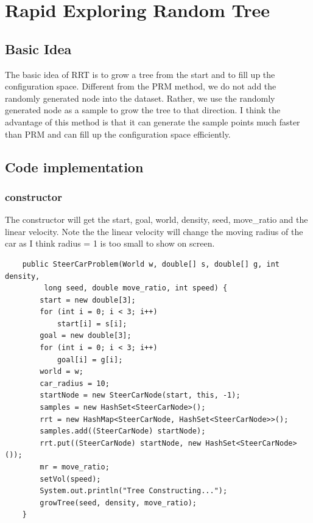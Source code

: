 \documentclass{article}
\begin{document}
\section{Rapid Exploring Random Tree}
\subsection{Basic Idea}
The basic idea of RRT is to grow a tree from the start and to fill up the configuration space. Different from the PRM method, we do not add the randomly generated node into the dataset. Rather, we use the randomly generated node as a sample to grow the tree to that direction. I think the advantage of this method is that it can generate the sample points much faster than PRM and can fill up the configuration space efficiently.

\clearpage
\subsection{Code implementation}
\subsubsection{constructor}
The constructor will get the start, goal, world, density, seed, move\_ratio and the linear velocity. Note the the linear velocity will change the moving radius of the car as I think radius = 1 is too small to show on screen.
\begin{lstlisting}
	public SteerCarProblem(World w, double[] s, double[] g, int density,
		 long seed, double move_ratio, int speed) {
		start = new double[3];
		for (int i = 0; i < 3; i++)
			start[i] = s[i];
		goal = new double[3];
		for (int i = 0; i < 3; i++)
			goal[i] = g[i];
		world = w;
		car_radius = 10;
		startNode = new SteerCarNode(start, this, -1);
		samples = new HashSet<SteerCarNode>();
		rrt = new HashMap<SteerCarNode, HashSet<SteerCarNode>>();
		samples.add((SteerCarNode) startNode);
		rrt.put((SteerCarNode) startNode, new HashSet<SteerCarNode>());
		mr = move_ratio;
		setVol(speed);
		System.out.println("Tree Constructing...");
		growTree(seed, density, move_ratio);
	}
\end{lstlisting}
\end{document}
